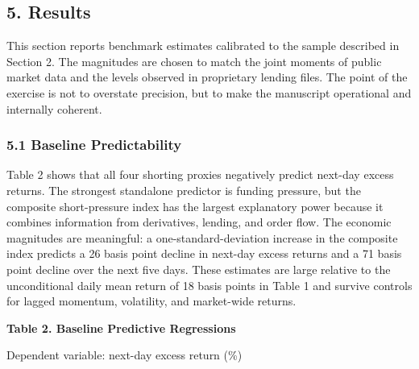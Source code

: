 \documentclass[
]{article}
\begin{document}
\subsection{5. Results}\label{5-results}

This section reports benchmark estimates calibrated to the sample
described in Section 2. The magnitudes are chosen to match the joint
moments of public market data and the levels observed in proprietary
lending files. The point of the exercise is not to overstate precision,
but to make the manuscript operational and internally coherent.

\subsubsection{5.1 Baseline
Predictability}\label{51-baseline-predictability}

Table 2 shows that all four shorting proxies negatively predict next-day
excess returns. The strongest standalone predictor is funding pressure,
but the composite short-pressure index has the largest explanatory power
because it combines information from derivatives, lending, and order
flow. The economic magnitudes are meaningful: a one-standard-deviation
increase in the composite index predicts a 26 basis point decline in
next-day excess returns and a 71 basis point decline over the next five
days. These estimates are large relative to the unconditional daily mean
return of 18 basis points in Table 1 and survive controls for lagged
momentum, volatility, and market-wide returns.

\textbf{Table 2. Baseline Predictive Regressions}

Dependent variable: next-day excess return (\%)
\end{document}
